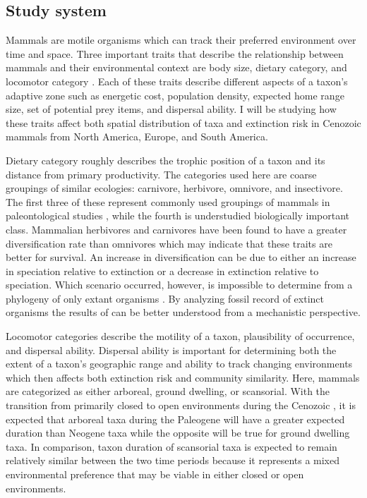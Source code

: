 \documentclass[11pt,letterpaper]{article}
\begin{document}
\subsection{Study system}
Mammals are motile organisms which can track their preferred environment over time and space. Three important traits that describe the relationship between mammals and their environmental context are body size, dietary category, and locomotor category \citep{Smith2004,Smith2008b,Damuth1981a,Damuth1979,Jernvall2004,Lyons2005,Lyons2010}. Each of these traits describe different aspects of a taxon's adaptive zone such as energetic cost, population density, expected home range size, set of potential prey items, and dispersal ability. I will be studying how these traits affect both spatial distribution of taxa and extinction risk in Cenozoic mammals from North America, Europe, and South America.

Dietary category roughly describes the trophic position of a taxon and its distance from primary productivity. The categories used here are coarse groupings of similar ecologies: carnivore, herbivore, omnivore, and insectivore. The first three of these represent commonly used groupings of mammals in paleontological studies \citep{Jernvall2004,Price2012}, while the fourth is understudied biologically important class. Mammalian herbivores and carnivores have been found to have a greater diversification rate than omnivores \citep{Price2012} which may indicate that these traits are better for survival. An increase in diversification can be due to either an increase in speciation relative to extinction or a decrease in extinction relative to speciation. Which scenario occurred, however, is impossible to determine from a phylogeny of only extant organisms \citep{Rabosky2010a}. By analyzing fossil record of extinct organisms the results of \citet{Price2012} can be better understood from a mechanistic perspective.

Locomotor categories describe the motility of a taxon, plausibility of occurrence, and dispersal ability. Dispersal ability is important for determining both the extent of a taxon's geographic range and ability to track changing environments \citep{Birand2012,Jablonski2006a,Gaston2009} which then affects both extinction risk and community similarity. Here, mammals are categorized as either arboreal, ground dwelling, or scansorial. With the transition from primarily closed to open environments during the Cenozoic \citep{Blois2009,Janis1993a,Stromberg2005,Stromberg2013}, it is expected that arboreal taxa during the Paleogene will have a greater expected duration than Neogene taxa while the opposite will be true for ground dwelling taxa. In comparison, taxon duration of scansorial taxa is expected to remain relatively similar between the two time periods because it represents a mixed environmental preference that may be viable in either closed or open environments. 
\end{document}
